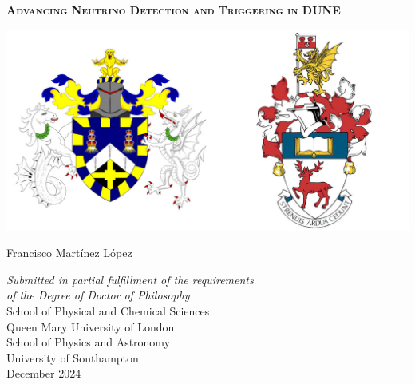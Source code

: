 \begin{titlepage}



\begin{center}

\begin{spacing}{2.5}
{\Huge \textsc{\textbf{Advancing Neutrino Detection and Triggering in DUNE}}}
\end{spacing}

\vspace{1.0 cm}

\begin{center}
\includegraphics[width=1.0\textwidth]{Images/both_crests}
\end{center}
\vspace{0.9cm}


{\LARGE Francisco Mart\'{i}nez L\'{o}pez} %

\vspace{1cm}


{\large %
\textit{Submitted in partial fulfillment of the
requirements \\ of the Degree of Doctor of Philosophy}\\
\vspace{0.9 cm}
School of Physical and Chemical Sciences\\
Queen Mary University of London\\
\vspace{0.5 cm}
School of Physics and Astronomy\\
University of Southampton\\
\vspace{0.5cm}
December 2024 %
}

\end{center}



\end{titlepage}

\restoregeometry  %
\doublespacing		%
